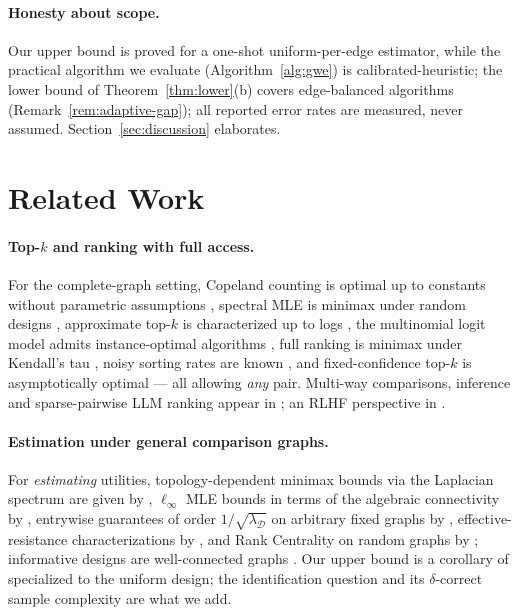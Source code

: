 \documentclass[11pt]{article}
\theoremstyle{definition}
\begin{document}
\paragraph{Honesty about scope.}  Our upper bound is proved for a one-shot uniform-per-edge estimator, while the practical algorithm we evaluate (Algorithm~\ref{alg:gwe}) is calibrated-heuristic; the lower bound of Theorem~\ref{thm:lower}(b) covers edge-balanced algorithms (Remark~\ref{rem:adaptive-gap}); all reported error rates are measured, never assumed.  Section~\ref{sec:discussion} elaborates.

\section{Related Work}
\label{sec:related}

\paragraph{Top-$k$ and ranking with full access.}  For the complete-graph setting, Copeland counting is optimal up to constants without parametric assumptions \cite{shah2015simple}, spectral MLE is minimax under random designs \cite{chen2015spectral,chen2017spectral}, approximate top-$k$ is characterized up to logs \cite{heckel2016active,heckel2018approximate}, the multinomial logit model admits instance-optimal algorithms \cite{chen2017a}, full ranking is minimax under Kendall's tau \cite{chen2021optimal}, noisy sorting rates are known \cite{wang2022noisy}, and fixed-confidence top-$k$ is asymptotically optimal \cite{goldberger2026optimal} --- all allowing \emph{any} pair.  Multi-way comparisons, inference and sparse-pairwise LLM ranking appear in \cite{fan2022ranking,catalina2025model,li2026low}; an RLHF perspective in \cite{zhu2023principled}.

\paragraph{Estimation under general comparison graphs.}  For \emph{estimating} utilities, topology-dependent minimax bounds via the Laplacian spectrum are given by \cite{shah2015estimation}, $\ell_\infty$ MLE bounds in terms of the algebraic connectivity by \cite{li2021ellinftybounds}, entrywise guarantees of order $1/\sqrt{\lambda_{\mathcal D}}$ on arbitrary fixed graphs by \cite{yang2026graphmonotone}, effective-resistance characterizations by \cite{chen2023ranking,han2026bradleyterry}, and Rank Centrality on random graphs by \cite{negahban2012rank}; informative designs are well-connected graphs \cite{osting2012optimal}.  Our upper bound is a corollary of \cite{yang2026graphmonotone} specialized to the uniform design; the identification question and its $\delta$-correct sample complexity are what we add.
\end{document}
